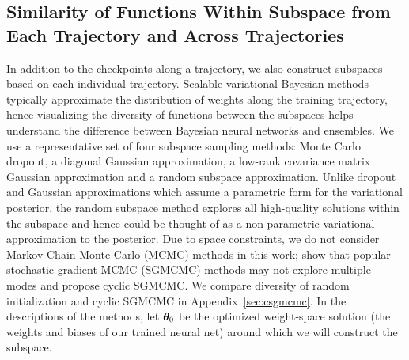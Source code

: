 \documentclass{article}
\begin{document}
\subsection{Similarity of Functions Within Subspace from Each Trajectory and Across Trajectories}
\label{sec:fun_similarity_subspace}
%
%
%
%
%
%
%
In addition to the checkpoints along a trajectory, we also construct subspaces based on each individual trajectory.  %
Scalable variational Bayesian methods typically approximate the distribution of weights along the training trajectory, hence visualizing the diversity of functions between the subspaces helps understand the difference between  Bayesian neural networks and ensembles.
%
We use a representative set of four subspace sampling methods: Monte Carlo dropout, a diagonal Gaussian approximation, a low-rank covariance matrix Gaussian approximation and a random subspace approximation.  
{Unlike dropout and Gaussian approximations which assume a parametric form for the variational posterior, the random subspace method explores all high-quality solutions within the subspace and hence could be thought of as a non-parametric variational approximation to the posterior.}  Due to space constraints, we do not consider Markov Chain Monte Carlo (MCMC) methods in this work; \citet{Zhang2020Cyclical} show that popular stochastic gradient MCMC (SGMCMC) methods may not explore multiple modes and propose cyclic SGMCMC. We compare diversity of random initialization and cyclic SGMCMC in Appendix~\ref{sec:csgmcmc}. 
In the descriptions of the methods, let ${\bm{\theta}}_0$ be the optimized weight-space solution (the weights and biases of our trained neural net) around which we will construct the subspace. %
%
%
\end{document}
